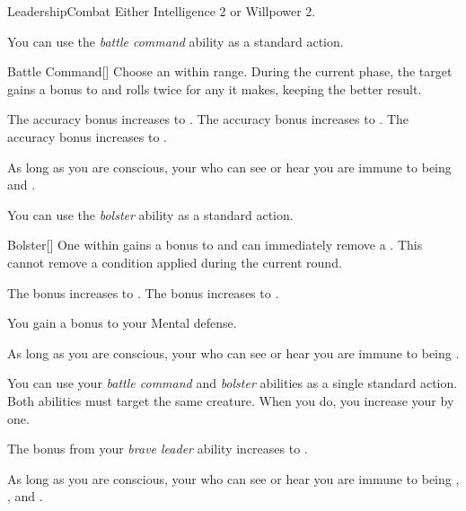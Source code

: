     \begin{feat}{Leadership}{Combat}
        \featpre Either Intelligence 2 or Willpower 2.

         You can use the \textit{battle command} ability as a standard action.
        \begin{freeability}{Battle Command}[]
            Choose an  within \rngmed range.
            During the current phase, the target gains a  bonus to  and rolls twice for any  it makes, keeping the better result.

            \rankline
             The accuracy bonus increases to .
             The accuracy bonus increases to .
             The accuracy bonus increases to .
        \end{freeability}

         As long as you are conscious, your  who can see or hear you are immune to being \shaken and \frightened.

         You can use the \textit{bolster} ability as a standard action.
        \begin{freeability}{Bolster}[]
            One  within \medrange {} gains a  bonus to  and can immediately remove a .
            This cannot remove a condition applied during the current round.

            \rankline
             The bonus increases to .
             The bonus increases to .
        \end{freeability}

         You gain a  bonus to your Mental defense.

         As long as you are conscious, your  who can see or hear you are immune to being \dazed.

         You can use your \textit{battle command} and \textit{bolster} abilities as a single standard action.
        Both abilities must target the same creature.
        When you do, you increase your  by one.

         The bonus from your \textit{brave leader} ability increases to .

         As long as you are conscious, your  who can see or hear you are immune to being \stunned, \confused, and \panicked.
    \end{feat}

